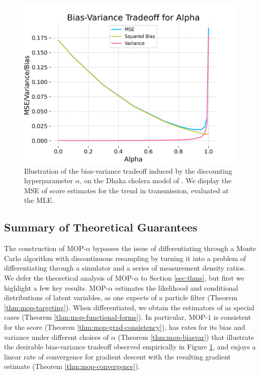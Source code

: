 \documentclass[9pt,twocolumn,pnasresearcharticle]{pnas-new}
\newcommand\arxiv[2]{#2} %
\begin{document}
\begin{figure}[ht!]
  \centering
    \includegraphics[width=\arxiv{10cm}{\textwidth/3}]{imgs/095/biasvar.png}
    \caption{Illustration of the bias-variance tradeoff induced by the discounting hyperparameter $\alpha$, on the Dhaka cholera model of \cite{king08}. We display the MSE of score estimates for the trend in transmission, evaluated at the MLE.}
    \label{fig:biasvar}
\end{figure}

\subsection{Summary of Theoretical Guarantees}

The construction of MOP-$\alpha$ bypasses the issue of differentiating through a Monte Carlo algorithm with discontinuous resampling by turning it into a problem of differentiating through a simulator and a series of measurement density ratios.
We defer the theoretical analysis of MOP-$\alpha$ to Section \ref{sec:thms}, but first we highlight a few key results.
MOP-$\alpha$ estimates the likelihood and conditional distributions of latent variables, as one expects of a particle filter (Theorem \ref{thm:mop-targeting}).
When differentiated, we obtain the estimators of \cite{poyiadjis11, scibior21, naesseth18} as special cases (Theorem \ref{thm:mop-functional-forms}).
In particular, MOP-$1$ is consistent for the score (Theorem \ref{thm:mop-grad-consistency}), has rates for its bias and variance under different choices of $\alpha$ (Theorem \ref{thm:mop-biasvar}) that illustrate the desirable bias-variance tradeoff observed empirically in Figure \ref{fig:biasvar}, and enjoys a linear rate of convergence for gradient descent with the resulting gradient estimate (Theorem \ref{thm:mop-convergence}).  
\end{document}
